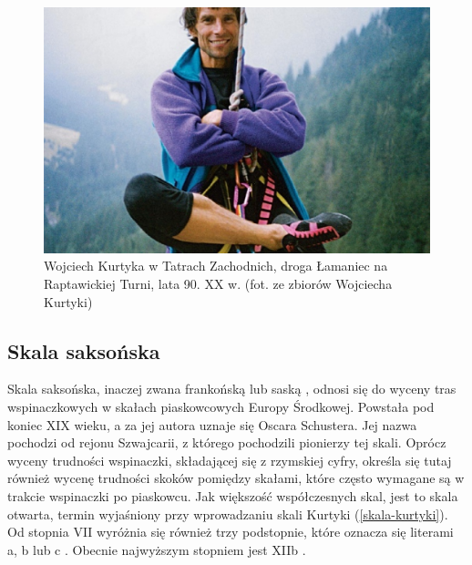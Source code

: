 \documentclass{article}
\begin{document}
\begin{figure}[!htbp]
	\begin{center}
		\includegraphics[width=0.9\linewidth]{images/kurtyka.eps}
	\end{center}
	\caption{Wojciech Kurtyka w Tatrach Zachodnich, droga Łamaniec na Raptawickiej Turni, lata 90. XX w. (fot. ze zbiorów Wojciecha Kurtyki) \cite{tyg-powszechni-kurtyka}}
	\label{kurtyka}
\end{figure}

\subsection{Skala saksońska}
Skala saksońska, inaczej zwana frankońską \cite{skalnik-skale} lub saską \cite{drytooling-skale}, odnosi się do wyceny tras wspinaczkowych w skałach piaskowcowych Europy Środkowej. Powstała pod koniec XIX wieku, a za jej autora uznaje się Oscara Schustera. Jej nazwa pochodzi od rejonu Szwajcarii, z którego pochodzili pionierzy tej skali. Oprócz wyceny trudności wspinaczki, składającej się z rzymskiej cyfry, określa się tutaj również wycenę trudności skoków pomiędzy skałami, które często wymagane są w trakcie wspinaczki po piaskowcu. Jak większość współczesnych skal, jest to skala otwarta, termin wyjaśniony przy wprowadzaniu skali Kurtyki (\ref{skala-kurtyki}). Od stopnia VII wyróżnia się również trzy podstopnie, które oznacza się literami a, b lub c \cite{climb-skale}. Obecnie najwyższym stopniem jest XIIb \cite{skalnik-skale}.
\end{document}
